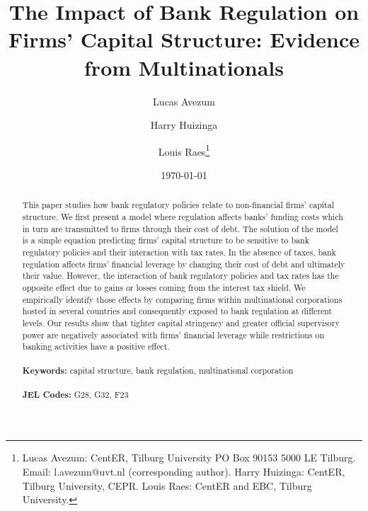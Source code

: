 \documentclass[12pt]{article}
\begin{document}
	
	\begin{titlepage}
		\title{The Impact of Bank Regulation on  Firms' Capital Structure: Evidence from Multinationals}
		
		\author{Lucas Avezum \and Harry Huizinga \and Louis Raes\thanks{Lucas Avezum: CentER, Tilburg University PO Box 90153 5000 LE Tilburg. Email:
				l.avezum@uvt.nl (corresponding author). Harry Huizinga: CentER, Tilburg University, CEPR. Louis Raes: CentER and EBC, Tilburg University.}}
		\date{\today}
		\maketitle
		\begin{abstract}
			\noindent This paper studies how bank regulatory policies relate to non-financial firms' capital structure. We first present a model where regulation affects banks' funding costs which in turn are transmitted to firms through their cost of debt. The solution of the model is a simple equation predicting firms' capital structure to be sensitive to bank regulatory policies and their interaction with tax rates. In the absence of taxes, bank regulation affects firms' financial leverage by changing their cost of debt and ultimately their value. However, the interaction of bank regulatory policies and tax rates has the opposite effect due to gains or losses coming from the interest tax shield. We empirically identify those effects by comparing firms within multinational corporations hosted in several countries and consequently exposed to bank regulation at different levels. Our results show that tighter capital stringency and greater official supervisory power are negatively associated with firms' financial leverage while restrictions on banking activities have a positive effect.   \\
			\vspace{0in}\\
			\noindent\textbf{Keywords:} capital structure, bank regulation, multinational corporation\\
			\vspace{0in}\\
			\noindent\textbf{JEL Codes:} G28, G32, F23 \\
			
			\bigskip
		\end{abstract}
		\setcounter{page}{0}
		\thispagestyle{empty}
	\end{titlepage}
	\pagebreak \newpage
	
	
	\normalem
	
\end{document}
